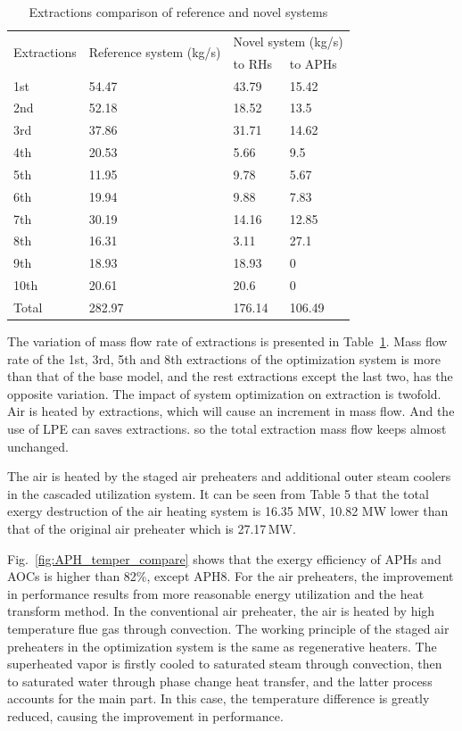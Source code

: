 \documentclass[preprint,12pt]{elsarticle}
\begin{document}
\begin{table}
\caption{Extractions comparison of reference and novel systems}
\label{table:extraction_compare}
\begin{centering}
\begin{tabular}{llll}
\toprule 
\multirow{2}{*}{Extractions} & \multirow{2}{2.5cm}{Reference system (kg/s)} & \multicolumn{2}{c}{Novel system (kg/s)}\tabularnewline
\cmidrule{3-4} 
 &  & to RHs & to APHs\tabularnewline
\midrule
1st & 54.47 & 43.79 & 15.42\tabularnewline
2nd & 52.18 & 18.52 & 13.5\tabularnewline
3rd & 37.86 & 31.71 & 14.62\tabularnewline
4th & 20.53 & 5.66 & 9.5\tabularnewline
5th & 11.95 & 9.78 & 5.67\tabularnewline
6th & 19.94 & 9.88 & 7.83\tabularnewline
7th & 30.19 & 14.16 & 12.85\tabularnewline
8th & 16.31 & 3.11 & 27.1\tabularnewline
9th & 18.93 & 18.93 & 0\tabularnewline
10th & 20.61 & 20.6 & 0\tabularnewline
Total & 282.97 & 176.14 & 106.49\tabularnewline
\bottomrule
\end{tabular}
\par\end{centering}
\end{table}

The variation of mass flow rate of extractions is presented in Table~\ref{table:extraction_compare}.
Mass flow rate of the 1st, 3rd, 5th and 8th extractions of the optimization system is more than that of the base model, and the rest extractions except the last two, has the opposite variation. 
 The impact of system optimization on extraction is twofold. 
 Air is heated by extractions, which will cause an increment in mass flow. 
 And the use of LPE can saves extractions.
 so the total extraction mass flow keeps almost unchanged.

The air is heated by the staged air preheaters and additional outer steam coolers in the cascaded utilization system.
It can be seen from Table 5 that the total exergy destruction of the air heating system is 16.35 MW, 10.82 MW lower than that of the original air preheater which is 27.17\,MW. 


Fig.~\ref{fig:APH_temper_compare} shows that the exergy efficiency of APHs and AOCs is higher than 82\%, except APH8.
For the air preheaters, the improvement in performance results from more reasonable energy utilization and the heat transform method. 
 In the conventional air preheater, the air is heated by high temperature flue gas through convection. 
 The working principle of the staged air preheaters in the optimization system is the same as regenerative heaters. 
 The superheated vapor is firstly cooled to saturated steam through convection, then to saturated water through phase change heat transfer, and the latter process accounts for the main part. 
 In this case, the temperature difference is greatly reduced, causing the improvement in performance.
\end{document}
